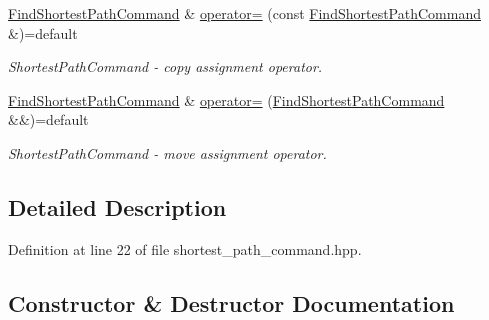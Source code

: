 \begin{DoxyCompactItemize}
\hyperlink{classmin__path_1_1command__handler_1_1_find_shortest_path_command}{Find\+Shortest\+Path\+Command} \& \hyperlink{classmin__path_1_1command__handler_1_1_find_shortest_path_command_a423cdd822936aa6d72754e83990950a5}{operator=} (const \hyperlink{classmin__path_1_1command__handler_1_1_find_shortest_path_command}{Find\+Shortest\+Path\+Command} \&)=default
\begin{DoxyCompactList}\small\item\em Shortest\+Path\+Command -\/ copy assignment operator. \end{DoxyCompactList}\item 
\hyperlink{classmin__path_1_1command__handler_1_1_find_shortest_path_command}{Find\+Shortest\+Path\+Command} \& \hyperlink{classmin__path_1_1command__handler_1_1_find_shortest_path_command_acb8dc0308ded77e2873bb3caeb7043f2}{operator=} (\hyperlink{classmin__path_1_1command__handler_1_1_find_shortest_path_command}{Find\+Shortest\+Path\+Command} \&\&)=default
\begin{DoxyCompactList}\small\item\em Shortest\+Path\+Command -\/ move assignment operator. \end{DoxyCompactList}\end{DoxyCompactItemize}


\subsection{Detailed Description}


Definition at line 22 of file shortest\+\_\+path\+\_\+command.\+hpp.



\subsection{Constructor \& Destructor Documentation}
